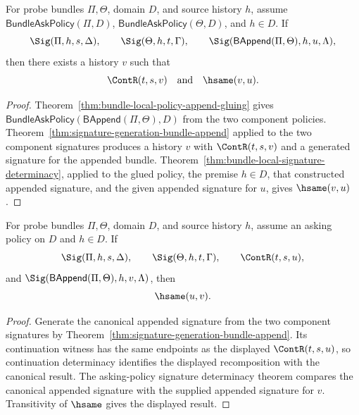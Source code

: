 \begin{theorem}
\label{thm:signature-generation-append-component-determinacy}
For probe bundles $\Pi,\Theta$, domain $D$, and source history $h$, assume
$\mathsf{BundleAskPolicy}(\Pi,D)$, $\mathsf{BundleAskPolicy}(\Theta,D)$, and
$h\in D$. If
$$
\Sig(\Pi,h,s,\Delta),
\qquad
\Sig(\Theta,h,t,\Gamma),
\qquad
\Sig(\mathsf{BAppend}(\Pi,\Theta),h,u,\Lambda),
$$
then there exists a history $v$ such that
$$
\ContR(t,s,v)
\quad\text{and}\quad
\hsame(v,u).
$$
\end{theorem}
\begin{proof}
Theorem~\ref{thm:bundle-local-policy-append-gluing} gives
$\mathsf{BundleAskPolicy}(\mathsf{BAppend}(\Pi,\Theta),D)$ from the two component policies. Theorem~\ref{thm:signature-generation-bundle-append} applied to the two component signatures produces a history $v$ with $\ContR(t,s,v)$ and a generated signature for the appended bundle. Theorem~\ref{thm:bundle-local-signature-determinacy}, applied to the glued policy, the premise $h\in D$, that constructed appended signature, and the given appended signature for $u$, gives $\hsame(v,u)$.
\end{proof}

\begin{theorem}
\label{thm:sigrel-bundleappend-recompose-hsame}
For probe bundles \(\Pi,\Theta\), domain \(D\), and source history \(h\), assume
an asking policy on \(D\) and \(h\in D\). If
$$
\Sig(\Pi,h,s,\Delta),
\qquad
\Sig(\Theta,h,t,\Gamma),
\qquad
\ContR(t,s,u),
$$
and \(\Sig(\mathsf{BAppend}(\Pi,\Theta),h,v,\Lambda)\), then
$$
\hsame(u,v).
$$
\end{theorem}
\begin{proof}
Generate the canonical appended signature from the two component signatures by
Theorem~\ref{thm:signature-generation-bundle-append}. Its continuation witness
has the same endpoints as the displayed \(\ContR(t,s,u)\), so continuation
determinacy identifies the displayed recomposition with the canonical result.
The asking-policy signature determinacy theorem compares the canonical appended
signature with the supplied appended signature for \(v\). Transitivity of
\(\hsame\) gives the displayed result.
\end{proof}

